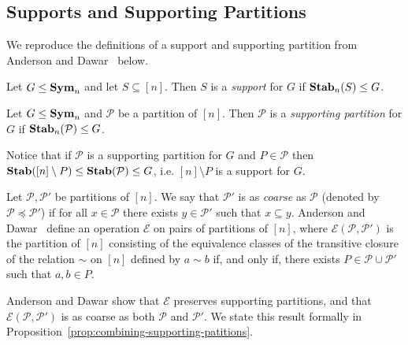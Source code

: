 \documentclass[../paper.tex]{subfiles}
\begin{document}

\subsection{Supports and Supporting Partitions}
We reproduce the definitions of a support and supporting partition
from Anderson and Dawar~\cite{AndersonD17} below.

\begin{definition}
  Let $G \leq \text{\textbf{Sym}}_n$ and let $S \subseteq [n]$. Then $S$ is a \emph{support}
  for $G$ if $\text{\textbf{Stab}}_n(S) \leq G$.
\end{definition}

\begin{definition}
  Let $G \leq \text{\textbf{Sym}}_n$ and $\mathcal{P}$ be a partition of $[n]$. Then
  $\mathcal{P}$ is a \emph{supporting partition} for $G$ if
  $\text{\textbf{Stab}}_n(\mathcal{P}) \leq G$.
\end{definition}

Notice that if $\mathcal{P}$ is a supporting partition for $G$ and $P \in
\mathcal{P}$ then $\text{\textbf{Stab}}([n] \setminus P) \leq \text{\textbf{Stab}}(\mathcal{P}) \leq G$, i.e.
$[n] \setminus P$ is a support for $G$.

Let $\mathcal{P}, \mathcal{P}'$ be partitions of $[n]$. We say that
$\mathcal{P}'$ is as \emph{coarse} as $\mathcal{P}$ (denoted by $\mathcal{P}
\preceq \mathcal{P}'$) if for all $x \in \mathcal{P}$ there exists $y \in
\mathcal{P}'$ such that $x \subseteq y$. Anderson and Dawar~\cite{AndersonD17}
define an operation $\mathcal{E}$ on pairs of partitions of $[n]$, where
$\mathcal{E} (\mathcal{P}, \mathcal{P}')$ is the partition of $[n]$ consisting
of the equivalence classes of the transitive closure of the relation $\sim$ on
$[n]$ defined by $a \sim b$ if, and only if, there exists $P \in \mathcal{P}
\cup \mathcal{P}'$ such that $a,b \in P$.

Anderson and Dawar show that $\mathcal{E}$ preserves supporting partitions, and
that $\mathcal{E}(\mathcal{P}, \mathcal{P}')$ is as coarse as both $\mathcal{P}$
and $\mathcal{P}'$. We state this result formally in
Proposition~\ref{prop:combining-supporting-patitions}.
\end{document}
